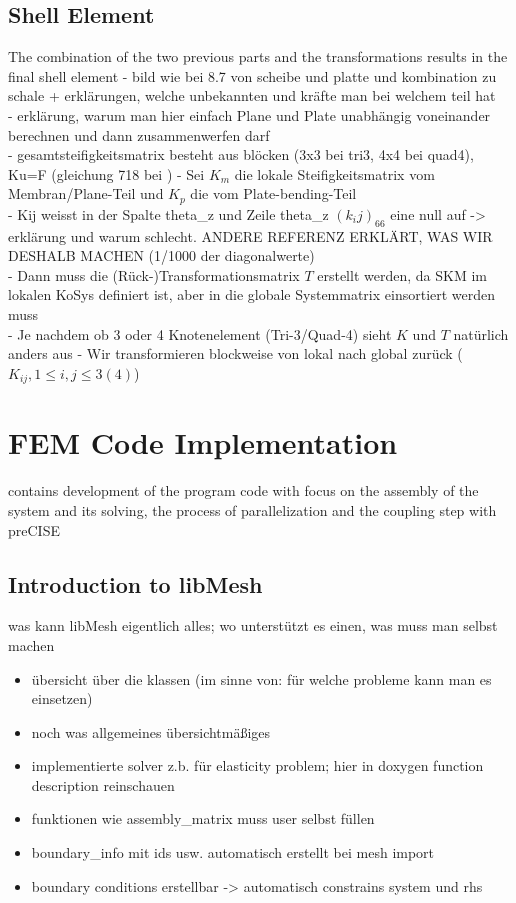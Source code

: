 \documentclass[11pt,twoside]{scrartcl}
\begin{document}
 \subsection{Shell Element}
 The combination of the two previous parts and the transformations results in the final shell element\newline
 - bild wie bei 8.7 von scheibe und platte und kombination zu schale + erklärungen, welche unbekannten und kräfte man bei welchem teil hat\\
 - erklärung, warum man hier einfach Plane und Plate unabhängig voneinander berechnen und dann zusammenwerfen darf\\
 - gesamtsteifigkeitsmatrix besteht aus blöcken (3x3 bei tri3, 4x4 bei quad4), Ku=F (gleichung 718 bei \cite{steinke2005finite})
 - Sei $K_m$ die lokale Steifigkeitsmatrix vom Membran/Plane-Teil und $K_p$ die vom Plate-bending-Teil\\
 - Kij weisst in der Spalte theta\_z und Zeile theta\_z $(k_ij)_66$ eine null auf -> erklärung und warum schlecht. ANDERE REFERENZ ERKLÄRT, WAS WIR DESHALB MACHEN (1/1000 der diagonalwerte)\\
 - Dann muss die (Rück-)Transformationsmatrix $T$ erstellt werden, da SKM im lokalen KoSys definiert ist, aber in die globale Systemmatrix einsortiert werden muss\\
 - Je nachdem ob 3 oder 4 Knotenelement (Tri-3/Quad-4) sieht $K$ und $T$ natürlich anders aus\newline
 - Wir transformieren blockweise von lokal nach global zurück ($K_{ij}, 1 \leq i,j \leq 3(4)$)\newline
 \newpage
\section{FEM Code Implementation}
contains development of the program code with focus on the assembly of the system and its solving, the process of parallelization and the coupling step with preCISE
 \subsection{Introduction to libMesh}
 was kann libMesh eigentlich alles; wo unterstützt es einen, was muss man selbst machen
 \begin{itemize}
  \item übersicht über die klassen (im sinne von: für welche probleme kann man es einsetzen)
  \item noch was allgemeines übersichtmäßiges
  \item implementierte solver z.b. für elasticity problem; hier in doxygen function description reinschauen
  \item funktionen wie assembly\_matrix muss user selbst füllen
  \item boundary\_info mit ids usw. automatisch erstellt bei mesh import
  \item boundary conditions erstellbar -> automatisch constrains system und rhs
 \end{itemize}
\end{document}
